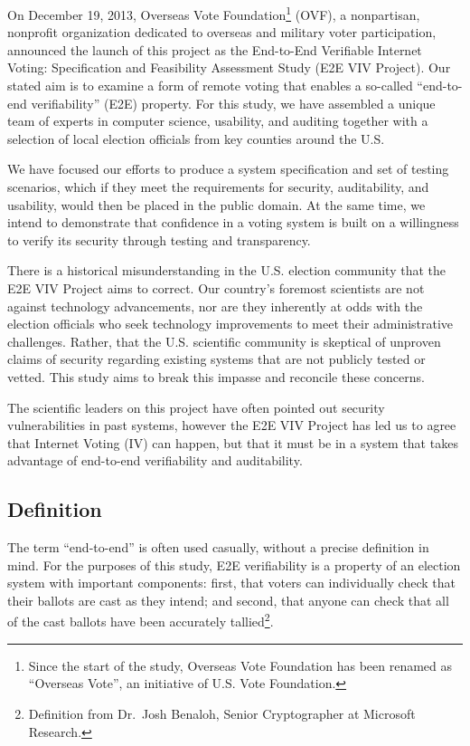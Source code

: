 On December 19, 2013, Overseas Vote Foundation\footnote{Since the
  start of the study, Overseas Vote Foundation has been renamed as
  “Overseas Vote”, an initiative of U.S. Vote Foundation.} (OVF), a
nonpartisan, nonprofit organization dedicated to overseas and military
voter participation, announced the launch of this project as the
End-to-End Verifiable Internet Voting: Specification and Feasibility
Assessment Study (E2E VIV Project). Our stated aim is to examine a
form of remote voting that enables a so-called “end-to-end
verifiability” (E2E) property. For this study, we have assembled a
unique team of experts in computer science, usability, and auditing
together with a selection of local election officials from key
counties around the U.S.

We have focused our efforts to produce a system specification and set
of testing scenarios, which if they meet the requirements for
security, auditability, and usability, would then be placed in the
public domain. At the same time, we intend to demonstrate that
confidence in a voting system is built on a willingness to verify its
security through testing and transparency.

There is a historical misunderstanding in the U.S. election community
that the E2E VIV Project aims to correct. Our country’s foremost
scientists are not against technology advancements, nor are they
inherently at odds with the election officials who seek technology
improvements to meet their administrative challenges. Rather, that the
U.S. scientific community is skeptical of unproven claims of security
regarding existing systems that are not publicly tested or vetted. This
study aims to break this impasse and reconcile these concerns.

The scientific leaders on this project have often pointed out security
vulnerabilities in past systems, however the E2E VIV Project has led
us to agree that Internet Voting (IV) can happen, but that it must be
in a system that takes advantage of end-to-end verifiability and
auditability. 

\subsection{Definition}
\label{sec:definition}

The term ``end-to-end'' is often used casually, without a precise
definition in mind. For the purposes of this study, E2E verifiability
is a property of an election system with important components: first,
that voters can individually check that their ballots are cast as they
intend; and second, that anyone can check that all of the cast ballots
have been accurately tallied\footnote{Definition from Dr.~Josh
  Benaloh, Senior Cryptographer at Microsoft Research.}.

